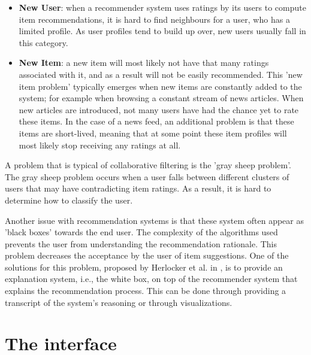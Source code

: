 \begin{itemize}
	\item \textbf{New User}: when a recommender system uses ratings by its users to compute item recommendations, it is hard to find neighbours for a user, who has a limited profile. As user profiles tend to build up over, new users usually fall in this category.
	\item \textbf{New Item}: a new item will most likely not have that many ratings associated with it, and as a result will not be easily recommended. This 'new item problem' typically emerges when new items are constantly added to the system; for example when browsing a constant stream of news articles. When new articles are introduced, not many users have had the chance yet to rate these items. In the case of a news feed, an additional problem is that these items are short-lived, meaning that at some point these item profiles will most likely stop receiving any ratings at all.
\end{itemize}

A problem that is typical of collaborative filtering is the 'gray sheep problem'\cite{burke:2002, herlocker:2000}. The gray sheep problem occurs when a user falls between different clusters of users that may have contradicting item ratings. As a result, it is hard to determine how to classify the user\cite{burke:2002}.

Another issue with recommendation systems is that these system often appear as 'black boxes' towards the end user. The complexity of the algorithms used prevents the user from understanding the recommendation rationale\cite{zhao:2010}. This problem decreases the acceptance by the user of item suggestions. One of the solutions for this problem, proposed by Herlocker et al. in \cite{herlocker:2000}, is to provide an explanation system, i.e., the white box, on top of the recommender system that explains the recommendation process. This can be done through providing a transcript of the system's reasoning or through visualizations\cite{herlocker:2000}.






% 
\section{The interface}\label{chapter:literature_study:section:interaction}

